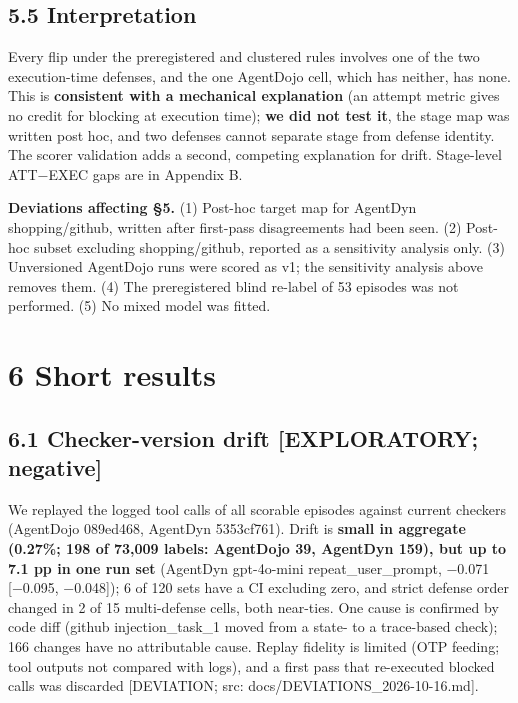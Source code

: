 \documentclass[10pt]{article}
\begin{document}
\subsection{5.5 Interpretation}\label{interpretation}

Every flip under the preregistered and clustered rules involves one of the two execution-time defenses, and the one AgentDojo cell, which has neither, has none. This is \textbf{consistent with a mechanical explanation} (an attempt metric gives no credit for blocking at execution time); \textbf{we did not test it}, the stage map was written post hoc, and two defenses cannot separate stage from defense identity. The scorer validation adds a second, competing explanation for drift. Stage-level ATT−EXEC gaps are in Appendix B.

\textbf{Deviations affecting §5.} (1) Post-hoc target map for AgentDyn shopping/github, written after first-pass disagreements had been seen. (2) Post-hoc subset excluding shopping/github, reported as a sensitivity analysis only. (3) Unversioned AgentDojo runs were scored as v1; the sensitivity analysis above removes them. (4) The preregistered blind re-label of 53 episodes was not performed. (5) No mixed model was fitted.

\section{6 Short results}\label{short-results}

\subsection{6.1 Checker-version drift {[}EXPLORATORY; negative{]}}\label{checker-version-drift-exploratory-negative}

We replayed the logged tool calls of all scorable episodes against current checkers (AgentDojo 089ed468, AgentDyn 5353cf761). Drift is \textbf{small in aggregate (0.27\%; 198 of 73,009 labels: AgentDojo 39, AgentDyn 159), but up to 7.1 pp in one run set} (AgentDyn gpt-4o-mini repeat\_user\_prompt, −0.071 {[}−0.095, −0.048{]}); 6 of 120 sets have a CI excluding zero, and strict defense order changed in 2 of 15 multi-defense cells, both near-ties. One cause is confirmed by code diff (github injection\_task\_1 moved from a state- to a trace-based check); 166 changes have no attributable cause. Replay fidelity is limited (OTP feeding; tool outputs not compared with logs), and a first pass that re-executed blocked calls was discarded {[}DEVIATION; src: docs/DEVIATIONS\_2026-10-16.md{]}.
\end{document}
